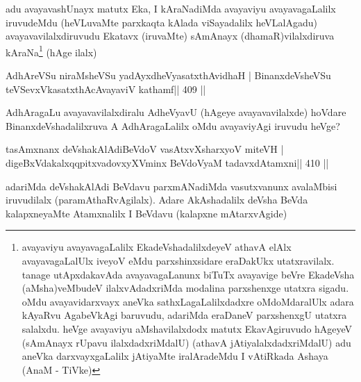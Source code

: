 \begin{artha}
adu avayavashUnayx matutx Eka, I kAraNadiMda avayaviyu avayava\-gaLalilx 
iruvudeMdu (heVLuvaMte parxkaqta kAlada viSayadalilx heVLalAgadu) 
avaya\-vavilalxdiruvudu Ekatavx (iruvaMte) sAmAnayx (dhamaR)vilalxdiruva 
kAraNa\footnote[1]{avayaviyu avayavagaLalilx EkadeVshadalilxdeyeV 
athavA elAlx avayavagaLalUlx iveyoV eMdu parxshinxsidare eraDakUkx 
utatxravilalx. tanage utApxdakavAda avayavagaLanunx biTuTx avayavige 
beVre EkadeVsha (aMsha)veMbudeV ilalxvAdadxriMda modalina parxshenxge 
utatxra sigadu. oMdu avayavidarxvayx aneVka sathxLagaLalilxdadxre oMdoMdaralUlx adara kAyaRvu AgabeVkAgi baruvudu, adariMda eraDaneV parxshenxgU utatxra salalxdu. heVge avayaviyu aMshavilalxdodx matutx EkavAgiruvudo hAgeyeV (sAmAnayx rUpavu ilalxdadxriMdalU) (athavA jAtiyalalxdadxriMdalU) adu aneVka darxvayxgaLalilx jAtiyaMte iralAradeMdu I vAtiRkada Ashaya (AnaM - TiVke)} (hAge ilalx) 
\end{artha}

\begin{shl}
\footnotemark[2]AdhAreVSu niraMsheVSu yadAyxdheVyasatxthAvidhaH |
BinanxdeVsheVSu teVSevxVkasatxthAcAvayaviV kathamf\hfill || 409 ||
\end{shl}

\begin{artha}
AdhAragaLu avayavavilalxdiralu AdheVyavU (hAgeye avayavavilalxde) hoVdare BinanxdeVshadalilxruva A AdhAragaLalilx oMdu avayaviyAgi iruvudu heVge?
\end{artha}

\begin{shl}
tasAmxnanx deVshakAlAdiBeVdoV vasAtxvXsharxyoV miteVH |
digeBxVdakalxqqpitxvadovxyXVminx BeVdoV\s yaM tadavxdAtamxni\hfill || 410 ||
\end{shl}

\begin{artha}
adariMda deVshakAlAdi BeVdavu parxmANadiMda vasutxvanunx avalaMbisi 
iruvudilalx (paramAthaRvAgilalx). Adare AkAshadalilx deVsha BeVda 
kalapxneyaMte Atamxnalilx I BeVdavu (kalapxne mAtarxvAgide)
\end{artha}

